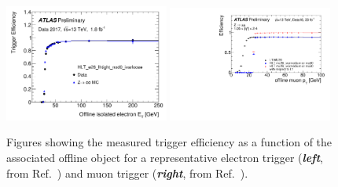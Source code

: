 \begin{figure}[!htb]
    \begin{center}
        \includegraphics[width=0.48\textwidth]{figures/common_ana/trig/egam_trig_example} 
        \includegraphics[width=0.48\textwidth]{figures/common_ana/trig/muon_trig_example} 
        \caption{
            Figures showing the measured trigger efficiency as a function of the associated
            offline object for a representative electron trigger (\textbf{\textit{left}}, from Ref.~\cite{EgammaTrig})
            and muon trigger (\textbf{\textit{right}}, from Ref.~\cite{MuonTrig}).
        }
        \label{fig:trig_example}
    \end{center}
\end{figure}


